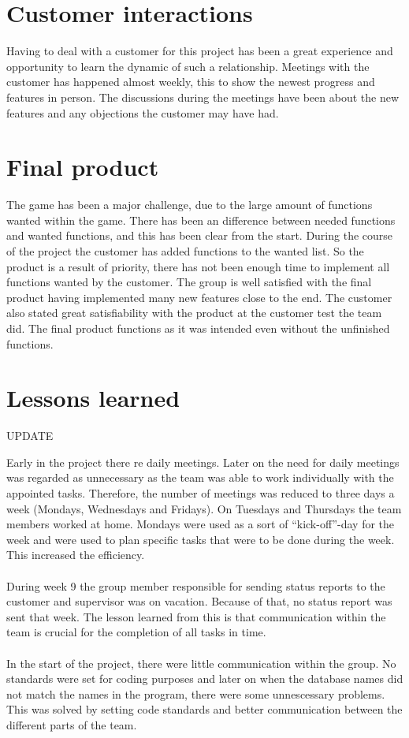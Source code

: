 \section{Customer interactions}
Having to deal with a customer for this project has been a great experience and opportunity to learn the dynamic of such a relationship. Meetings with the customer has happened almost weekly, this to show the newest progress and features in person. The discussions during the meetings have been about the new features and any objections the customer may have had. 


\section{Final product}
The game has been a major challenge, due to the large amount of functions wanted within the game. There has been an difference between needed functions and wanted functions, and this has been clear from the start. During the course of the project the customer has added functions to the wanted list. So the product is a result of priority, there has not been enough time to implement all functions wanted by the customer. The group is well satisfied with the final product having implemented many new features close to the end. The customer also stated great satisfiability with the product at the customer test the team did. The final product functions as it was intended even without the unfinished functions. 

\section{Lessons learned}

UPDATE

Early in the project there 
re daily meetings. Later on the need for daily meetings was regarded as unnecessary as the team was able to work individually with the appointed tasks. Therefore, the number of meetings was reduced to three days a week (Mondays, Wednesdays and Fridays). On Tuesdays and Thursdays the team members worked at home. Mondays were used as a sort of “kick-off”-day for the week and were used to plan specific tasks that were to be done during the week. This increased the efficiency.\\
\\
During week 9 the group member responsible for sending status reports to the customer and supervisor was on vacation. Because of that, no status report was sent that week. The lesson learned from this is that communication within the team is crucial for the completion of all tasks in time.\\
\\
In the start of the project, there were little communication within the group. No standards were set
for coding purposes and later on when the database names did not match the names in the program, there were some unnescessary problems. This was solved by setting code standards and better communication between the different 
parts of the team. \\
